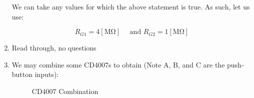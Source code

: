 \begin{enumerate}
    We can take any values for which the above statement is true. As such, let us use:

    $$\boxed{R_{G1}=4[\si{\mega\ohm}]\quad\text{ and }R_{G2}=1[\si{\mega\ohm}]}$$

  \item Read through, no questions \textcolor{green}{\checkmark}

  \item We may combine some CD4007s to obtain (Note A, B, and C are the push-button inputs):

    \begin{figure}[H]
      \centering
      
      \caption{CD4007 Combination}
      \label{fig:1}
    \end{figure}

\end{enumerate}



